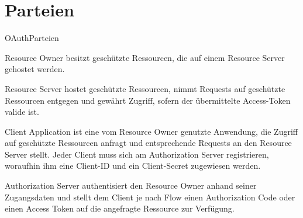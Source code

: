 \section{Parteien}
\begin{labeling}{OAuthParteien}
    \item [Resource Owner] besitzt geschützte Ressourcen, die auf einem Resource Server gehostet werden.
    \item [Resource Server] hostet geschützte Ressourcen, nimmt Requests auf geschützte Ressourcen entgegen und gewährt Zugriff, sofern der übermittelte Access-Token valide ist.
    \item [Client Application] ist eine vom Resource Owner genutzte Anwendung, die Zugriff auf geschützte Ressourcen anfragt und entsprechende Requests an den Resource Server stellt. Jeder Client muss sich am Authorization Server registrieren, woraufhin ihm eine Client-ID und ein Client-Secret zugewiesen werden.
    \item[Authorization Server] authentisiert den Resource Owner anhand seiner Zugangsdaten und stellt dem Client je nach Flow einen Authorization Code oder einen Access Token auf die angefragte Ressource zur Verfügung.
\end{labeling}
